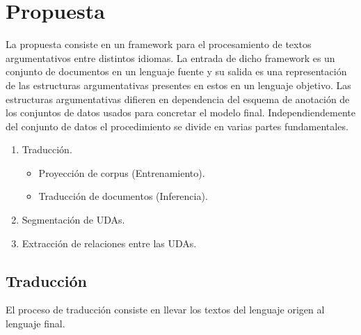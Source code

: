 \chapter{Propuesta}\label{chapter:proposal}





La propuesta consiste en un framework para el procesamiento de textos argumentativos entre distintos idiomas.
La entrada de dicho framework es un conjunto de documentos en un lenguaje fuente y su salida es una representación
de las estructuras argumentativas presentes en estos en un lenguaje objetivo. Las estructuras argumentativas 
difieren en dependencia del esquema de anotación de los conjuntos de datos usados para concretar el modelo
final. Independiendemente del conjunto de datos el procedimiento se divide en varias partes fundamentales.

\begin{enumerate}
    \item Traducción.
    \begin{itemize}
        \item Proyección de corpus (Entrenamiento).
        \item Traducción de documentos (Inferencia).
    \end{itemize}
    \item Segmentación de UDAs.
    \item Extracción de relaciones entre las UDAs.
\end{enumerate}

\section{Traducción}

El proceso de traducción consiste en llevar los textos del lenguaje origen al lenguaje final.

